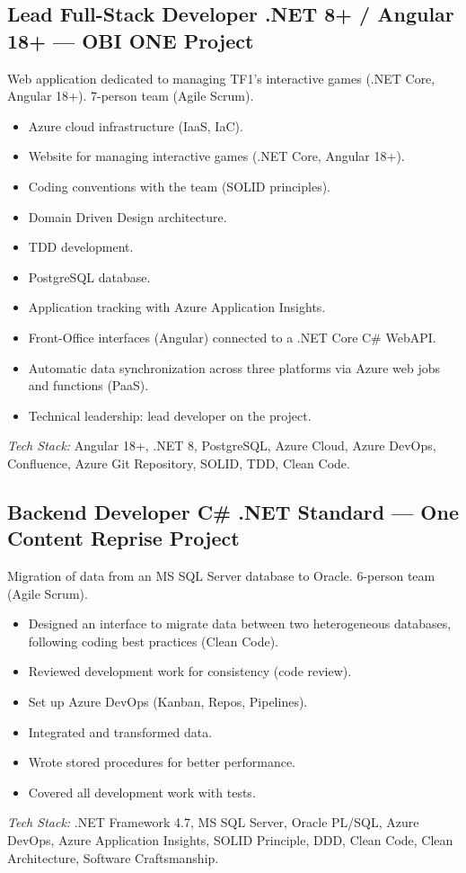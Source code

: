 \documentclass[10pt,a4paper]{article}
\begin{document}
\vspace{6pt}

\subsection*{Lead Full-Stack Developer .NET 8+ / Angular 18+ --- OBI ONE Project}
\color{darkgray}
Web application dedicated to managing TF1's interactive games (.NET Core, Angular 18+). 7-person team (Agile Scrum).
\begin{itemize}
  \item Azure cloud infrastructure (IaaS, IaC).
  \item Website for managing interactive games (.NET Core, Angular 18+).
  \item Coding conventions with the team (SOLID principles).
  \item Domain Driven Design architecture.
  \item TDD development.
  \item PostgreSQL database.
  \item Application tracking with Azure Application Insights.
  \item Front-Office interfaces (Angular) connected to a .NET Core C\# WebAPI.
  \item Automatic data synchronization across three platforms via Azure web jobs and functions (PaaS).
  \item Technical leadership: lead developer on the project.
\end{itemize}
\textit{Tech Stack:} Angular 18+, .NET 8, PostgreSQL, Azure Cloud, Azure DevOps, Confluence, Azure Git Repository, SOLID, TDD, Clean Code.

\vspace{6pt}

\subsection*{Backend Developer C\# .NET Standard --- One Content Reprise Project}
\color{darkgray}
Migration of data from an MS SQL Server database to Oracle. 6-person team (Agile Scrum).
\begin{itemize}
  \item Designed an interface to migrate data between two heterogeneous databases, following coding best practices (Clean Code).
  \item Reviewed development work for consistency (code review).
  \item Set up Azure DevOps (Kanban, Repos, Pipelines).
  \item Integrated and transformed data.
  \item Wrote stored procedures for better performance.
  \item Covered all development work with tests.
\end{itemize}
\textit{Tech Stack:} .NET Framework 4.7, MS SQL Server, Oracle PL/SQL, Azure DevOps, Azure Application Insights, SOLID Principle, DDD, Clean Code, Clean Architecture, Software Craftsmanship.
\end{document}

